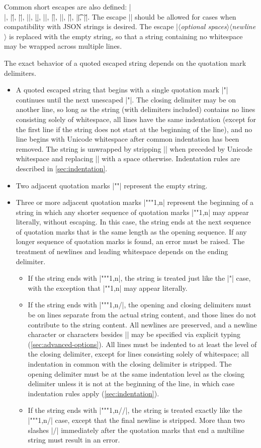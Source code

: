 \documentclass[11pt]{article}
\newcommand{\vmeta}[1]{{\color{DarkRed}\ensuremath{\langle}\textit{#1}\ensuremath{\rangle}}}
\begin{document}
Common short escapes are also defined:  |\\|, |\'|, |\"|, |\a|, |\b|, |\e|, |\f|, |\n|, |\r|, |\t|, |\v|.  The escape |\/| should be allowed for cases when compatibility with JSON strings is desired.  The escape |\|\vmeta{optional spaces}\vmeta{newline} is replaced with the empty string, so that a string containing no whitespace may be wrapped across multiple lines.

The exact behavior of a quoted escaped string depends on the quotation mark delimiters.
\begin{itemize}
\item A quoted escaped string that begins with a single quotation mark |"| continues until the next unescaped |"|.  The closing delimiter may be on another line, so long as the string (with delimiters included) contains no lines consisting solely of whitespace, all lines have the same indentation (except for the first line if the string does not start at the beginning of the line), and no line begins with Unicode whitespace after common indentation has been removed.  The string is unwrapped by stripping |\n| when preceded by Unicode whitespace and replacing |\n| with a space otherwise.  Indentation rules are described in \cref{sec:indentation}.
\item Two adjacent quotation marks |""| represent the empty string.
\item Three or more adjacent quotation marks |"""{1,n}| represent the beginning of a string in which any shorter sequence of quotation marks |""{1,n}| may appear literally, without escaping.  In this case, the string ends at the next sequence of quotation marks that is the same length as the opening sequence.  If any longer sequence of quotation marks is found, an error must be raised.  The treatment of newlines and leading whitespace depends on the ending delimiter.
    \begin{itemize}
    \item If the string ends with |"""{1,n}|, the string is treated just like the |"| case, with the exception that |""{1,n}| may appear literally.
    \item If the string ends with |"""{1,n}/|, the opening and closing delimiters must be on lines separate from the actual string content, and those lines do not contribute to the string content.  All newlines are preserved, and a newline character or characters besides |\n| may be specified via explicit typing (\cref{sec:advanced-options}).  All lines must be indented to at least the level of the closing delimiter, except for lines consisting solely of whitespace; all indentation in common with the closing delimiter is stripped.  The opening delimiter must be at the same indentation level as the closing delimiter unless it is not at the beginning of the line, in which case indentation rules apply (\cref{sec:indentation}).
    \item If the string ends with |"""{1,n}//|, the string is treated exactly like the |"""{1,n}/| case, except that the final newline is stripped.  More than two slashes |/| immediately after the quotation marks that end a multiline string must result in an error.
    \end{itemize}
\end{itemize}
\end{document}
